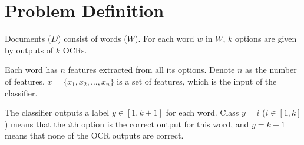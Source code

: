 \documentclass{article}
\begin{document}
\section{Problem Definition}

Documents ($D$) consist of words ($W$). For each word $w$ in $W$, $k$
options are given by outputs of $k$ OCRs.

Each word has $n$ features extracted from all its options. Denote $n$ as
the number of features. $x = \{x_1, x_2, \ldots, x_n\}$ is a set of
features, which is the input of the classifier.

The classifier outputs a label $y \in [1,k+1]$ for each word. Class
$y = i$ ($i \in [1, k]$) means that the $i$th option is the correct
output for this word, and $y = k+1$ means that none of the OCR outputs
are correct.
\end{document}

